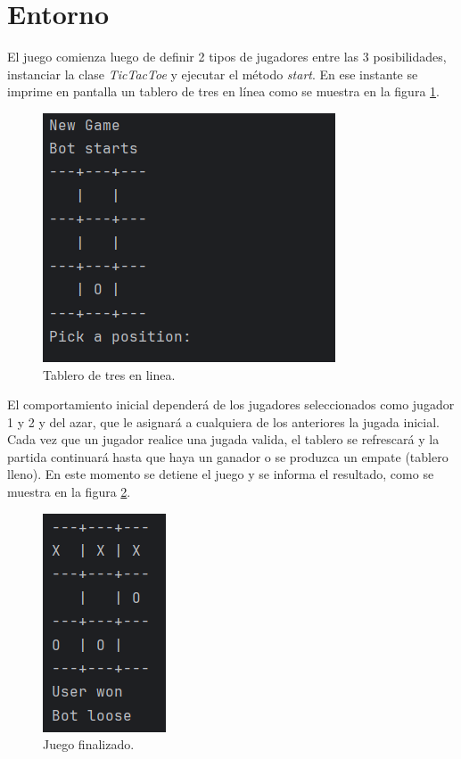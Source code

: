 \section{Entorno}

El juego comienza luego de definir 2 tipos de jugadores entre las 3 posibilidades, instanciar la clase \textit{TicTacToe} y ejecutar el método \textit{start}. En ese instante se imprime en pantalla un tablero de tres en línea como se muestra en la figura \ref{fig:board}. 

\begin{figure}[htbp]
	\centering
	\includegraphics[width=.5\textwidth]{./Figures/board.png}
	\caption{Tablero de tres en linea.}
	\label{fig:board}
\end{figure}

El comportamiento inicial dependerá de los jugadores seleccionados como jugador 1 y 2 y del azar, que le asignará a cualquiera de los anteriores la jugada inicial. Cada vez que un jugador realice una jugada valida, el tablero se refrescará y la partida continuará hasta que haya un ganador o se produzca un empate (tablero lleno). En este momento se detiene el juego y se informa el resultado, como se muestra en la figura \ref{fig:board_end}.

\begin{figure}[htbp]
	\centering
	\includegraphics[width=.25\textwidth]{./Figures/board_end.png}
	\caption{Juego finalizado.}
	\label{fig:board_end}
\end{figure}

